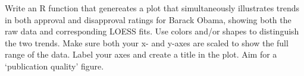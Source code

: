 \medskip
\begin{assignment}
Write an R function that genereates a plot that
simultaneously illustrates trends in both approval and disapproval
ratings for Barack Obama, showing both the raw data and corresponding
LOESS fits. Use colors and/or shapes to distinguish the two trends. Make
sure both your x- and y-axes are scaled to show the full range of the
data. Label your axes and create a title in the plot. Aim for a
`publication quality' figure.
\end{assignment}

